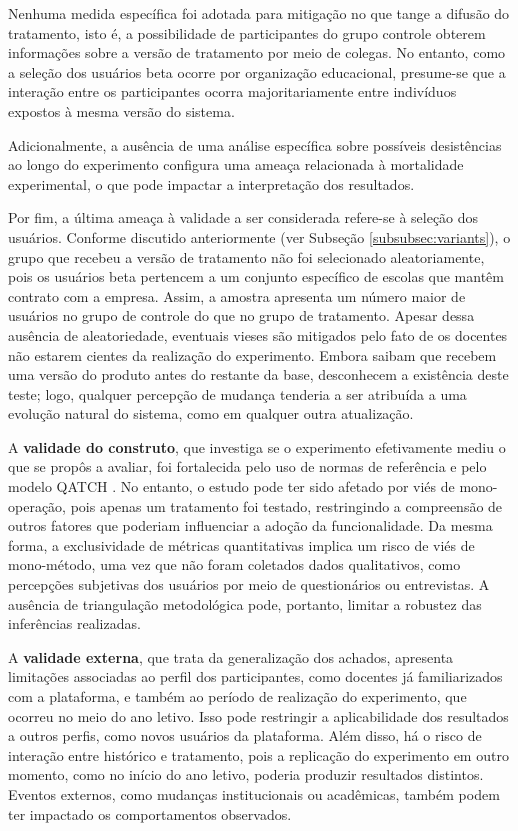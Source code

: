 Nenhuma medida específica foi adotada para mitigação no que tange a difusão do tratamento, isto é, a possibilidade de participantes do grupo controle obterem informações sobre a versão de tratamento por meio de colegas. No entanto, como a seleção dos usuários beta ocorre por organização educacional, presume-se que a interação entre os participantes ocorra majoritariamente entre indivíduos expostos à mesma versão do sistema.

Adicionalmente, a ausência de uma análise específica sobre possíveis desistências ao longo do experimento configura uma ameaça relacionada à mortalidade experimental, o que pode impactar a interpretação dos resultados.

Por fim, a última ameaça à validade a ser considerada refere-se à seleção dos usuários. Conforme discutido anteriormente (ver Subseção \ref{subsubsec:variants}), o grupo que recebeu a versão de tratamento não foi selecionado aleatoriamente, pois os usuários beta pertencem a um conjunto específico de escolas que mantêm contrato com a empresa. Assim, a amostra apresenta um número maior de usuários no grupo de controle do que no grupo de tratamento. Apesar dessa ausência de aleatoriedade, eventuais vieses são mitigados pelo fato de os docentes não estarem cientes da realização do experimento. Embora saibam que recebem uma versão do produto antes do restante da base, desconhecem a existência deste teste; logo, qualquer percepção de mudança tenderia a ser atribuída a uma evolução natural do sistema, como em qualquer outra atualização.

A \textbf{validade do construto}, que investiga se o experimento efetivamente mediu o que se propôs a avaliar, foi fortalecida pelo uso de normas de referência e pelo modelo QATCH \cite{nbr9241, qatch}. No entanto, o estudo pode ter sido afetado por viés de mono-operação, pois apenas um tratamento foi testado, restringindo a compreensão de outros fatores que poderiam influenciar a adoção da funcionalidade. Da mesma forma, a exclusividade de métricas quantitativas implica um risco de viés de mono-método, uma vez que não foram coletados dados qualitativos, como percepções subjetivas dos usuários por meio de questionários ou entrevistas. A ausência de triangulação metodológica pode, portanto, limitar a robustez das inferências realizadas.

A \textbf{validade externa}, que trata da generalização dos achados, apresenta limitações associadas ao perfil dos participantes, como docentes já familiarizados com a plataforma, e também ao período de realização do experimento, que ocorreu no meio do ano letivo. Isso pode restringir a aplicabilidade dos resultados a outros perfis, como novos usuários da plataforma. Além disso, há o risco de interação entre histórico e tratamento, pois a replicação do experimento em outro momento, como no início do ano letivo, poderia produzir resultados distintos. Eventos externos, como mudanças institucionais ou acadêmicas, também podem ter impactado os comportamentos observados.

